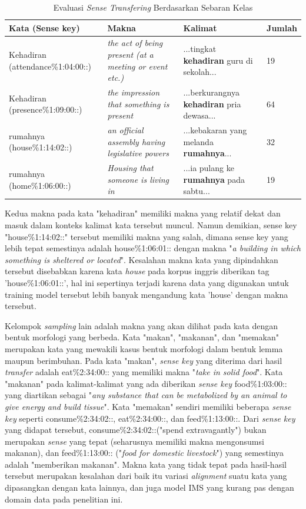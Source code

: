 \begin{table}
	\centering
	\caption{Evaluasi \textit{Sense Transfering} Berdasarkan Sebaran Kelas}
	\label{table:class-instance-sense-transfering-evaluation}
	\begin{tabular}{|p{4cm}|p{2.85cm}|p{2.85cm}|p{1.2cm}|}
		\hline
		Kata (Sense key) & Makna & Kalimat & Jumlah
		\\ \hline
		Kehadiran (attendance\%1:04:00::)  & 
		\textit{the act of being present (at a meeting or event etc.)}   & 
		...tingkat \textbf{kehadiran} guru di sekolah... &
		19
		\\ \hline
		Kehadiran (presence\%1:09:00::) & 
		\textit{the impression that something is present}   & 
		...berkurangnya \textbf{kehadiran} pria dewasa...
		&
		64
		\\ \hline
		rumahnya (house\%1:14:02::) & 
		\textit{an official assembly having legislative powers} & 
		...kebakaran yang melanda \textbf{rumahnya}...
		& 32
		\\ \hline
		rumahnya (home\%1:06:00::) &
		\textit{Housing that someone is living in} &
		...ia pulang ke \textbf{rumahnya} pada sabtu...
		& 19
		\\ \hline
	\end{tabular}
\end{table}

Kedua makna pada kata "kehadiran" memiliki makna yang relatif dekat dan masuk dalam konteks kalimat kata tersebut muncul. Namun demikian, sense key "house\%1:14:02::" tersebut memiliki makna yang salah, dimana sense key yang lebih tepat semestinya adalah house\%1:06:01:: dengan makna "\textit{a building in which something is sheltered or located}". Kesalahan makna kata yang dipindahkan tersebut disebabkan karena kata \textit{house} pada korpus inggris diberikan tag 'house\%1:06:01::', hal ini sepertinya terjadi karena data yang digunakan untuk training model tersebut lebih banyak mengandung kata 'house' dengan makna tersebut.

Kelompok \textit{sampling} lain adalah makna yang akan dilihat pada kata dengan bentuk morfologi yang berbeda. Kata "makan", "makanan", dan "memakan" merupakan kata yang mewakili kasus bentuk morfologi dalam bentuk lemma maupun berimbuhan. Pada kata "makan", \textit{sense key} yang diterima dari hasil \textit{transfer} adalah eat\%2:34:00:: yang memiliki makna "\textit{take in solid food}". Kata "makanan" pada kalimat-kalimat yang ada diberikan \textit{sense key} food\%1:03:00:: yang diartikan sebagai "\textit{any substance that can be metabolized by an animal to give energy and build tissue}". Kata "memakan" sendiri memiliki beberapa \textit{sense key} seperti consume\%2:34:02::, eat\%2:34:00::, dan feed\%1:13:00::. Dari \textit{sense key} yang didapat tersebut, consume\%2:34:02::("spend extravagantly") bukan merupakan \textit{sense} yang tepat (seharusnya memiliki makna mengonsumsi makanan), dan feed\%1:13:00:: ("\textit{food for domestic livestock}") yang semestinya adalah "memberikan makanan". Makna kata yang tidak tepat pada hasil-hasil tersebut merupakan kesalahan dari baik itu variasi \textit{alignment} suatu kata yang dipasangkan dengan kata lainnya, dan juga model IMS yang kurang pas dengan domain data pada penelitian ini.

